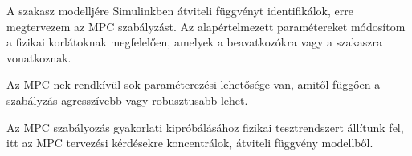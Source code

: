 

A szakasz modelljére Simulinkben átviteli függvényt identifikálok, erre megtervezem az MPC szabályzást. Az alapértelmezett paramétereket módosítom a fizikai korlátoknak megfelelően,  amelyek a beavatkozókra vagy a szakaszra vonatkoznak.

Az MPC-nek rendkívül sok paraméterezési lehetősége van, amitől függően a szabályzás agresszívebb vagy robusztusabb lehet.   %

Az MPC szabályozás gyakorlati kipróbálásához fizikai tesztrendszert állítunk fel, itt az MPC tervezési kérdésekre koncentrálok, átviteli függvény modellből.












